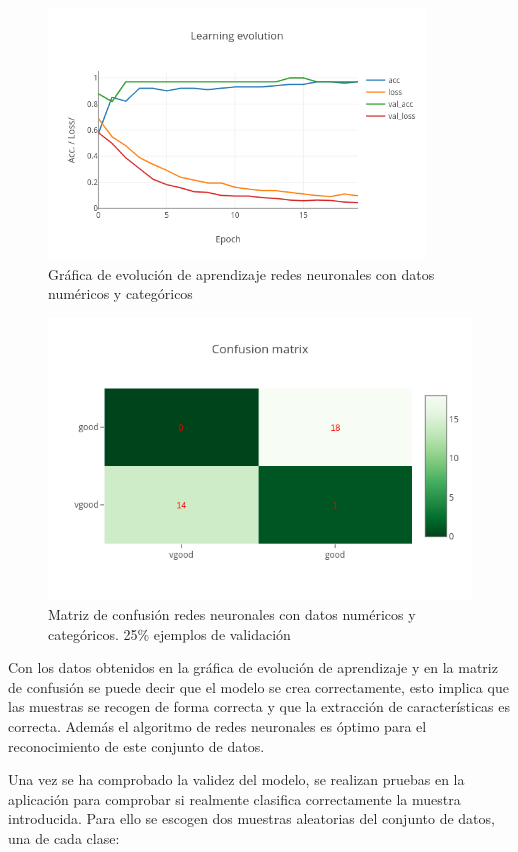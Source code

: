 \documentclass[a4paper, 12pt]{book}
\begin{document}
 \begin{figure}
	\centering
	\includegraphics[width=10cm, keepaspectratio]{img/le_numycat_rn.png}
	\caption{Gráfica de evolución de aprendizaje redes neuronales con datos numéricos y categóricos} 	\label{fig:ejemplo18}
\end{figure}

\begin{figure}
	\centering
	\includegraphics[width=12cm, keepaspectratio]{img/cm_numycat_rn.png}
	\caption{Matriz de confusión redes neuronales con datos numéricos y categóricos. 25\% ejemplos de validación} 	
	\label{fig:ejemplo19}
\end{figure}

 
Con los datos obtenidos en la gráfica de evolución de aprendizaje y en la matriz de confusión se puede decir que el modelo se crea correctamente, esto implica que las muestras se recogen de forma correcta y que la extracción de características es correcta. Además el algoritmo de redes neuronales es óptimo para el reconocimiento de este conjunto de datos.

Una vez se ha comprobado la validez del modelo, se realizan pruebas en la aplicación para comprobar si realmente clasifica correctamente la muestra introducida. Para ello se escogen dos muestras aleatorias del conjunto de datos, una de cada clase:
\end{document}
